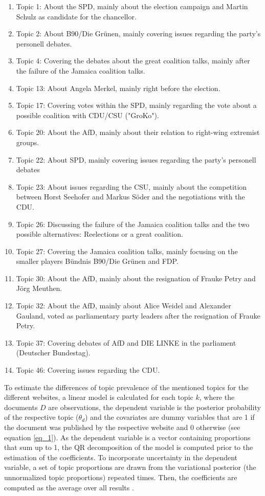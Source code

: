 \documentclass[12pt,a4paper,notitlepage]{article}
\begin{document}
\begin{enumerate}
	\item Topic 1: About the SPD, mainly about the election campaign and Martin Schulz as candidate for the chancellor.	
	\item Topic 2: About B90/Die Grünen, mainly covering issues regarding the party's personell debates.
	\item Topic 4: Covering the debates about the great coalition talks, mainly after the failure of the Jamaica coalition talks.
	\item Topic 13: About Angela Merkel, mainly right before the election. 
	\item Topic 17: Covering votes within the SPD, mainly regarding the vote about a possible coalition with CDU/CSU ("GroKo").	
	\item Topic 20: About the AfD, mainly about their relation to right-wing extremist groups.
	\item Topic 22: About SPD, mainly covering issues regarding the party's personell debates
	\item Topic 23: About issues regarding the CSU, mainly about the competition between Horst Seehofer and Markus Söder and the negotiations with the CDU.
	\item Topic 26: Discussing the failure of the Jamaica coalition talks and the two possible alternatives: Reelections or a great coalition.
	\item Topic 27: Covering the Jamaica coalition talks, mainly focusing on the smaller players Bündnis B90/Die Grünen and FDP.	
	\item Topic 30: About the AfD, mainly about the resignation of Frauke Petry and Jörg Meuthen.
	\item Topic 32: About the AfD, mainly about Alice Weidel and Alexander Gauland, voted as parliamentary party leaders after the resignation of Frauke Petry.
	\item Topic 37: Covering debates of AfD and DIE LINKE in the parliament (Deutscher Bundestag).
	\item Topic 46: Covering issues regarding the CDU.
\end{enumerate}   

To estimate the differences of topic prevalence of the mentioned topics for the different websites, a linear model is calculated for each topic $k$, where the documents $D$ are observations, the dependent variable is the posterior probability of the respective topic ($\theta_{d}$) and the covariates are dummy variables that are 1 if the document was published by the respective website and 0 otherwise (see equation \ref{eq_1}). As the dependent variable is a vector containing proportions that sum up to 1, the QR decomposition of the model is computed prior to the estimation of the coefficients. To incorporate uncertainty in the dependent variable, a set of topic proportions are drawn from the variational posterior (the unnormalized topic proportions) repeated times. Then, the coefficients are computed as the average over all results \citep{roberts_model_2016}.
\end{document}
